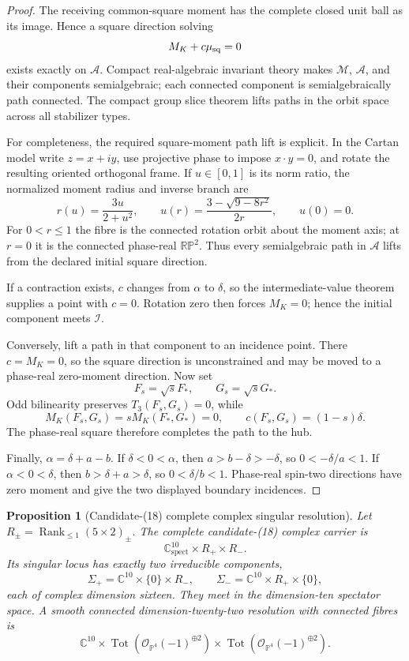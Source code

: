 \documentclass[11pt]{article}
\newtheorem{proposition}[theorem]{Proposition}
\theoremstyle{definition}
\theoremstyle{remark}
\begin{document}
\begin{proof}
The receiving common-square moment has the complete closed unit ball as its
image.  Hence a square direction solving
\[
 M_K+c\mu_{\rm sq}=0
\]
exists exactly on \(\mathcal A\).  Compact real-algebraic invariant theory
makes \(\mathcal M\), \(\mathcal A\), and their components semialgebraic;
each connected component is semialgebraically path connected.  The compact
group slice theorem lifts paths in the orbit space across all stabilizer
types.

For completeness, the required square-moment path lift is explicit.  In the
Cartan model write \(z=x+iy\), use projective phase to impose
\(x\cdot y=0\), and rotate the resulting oriented orthogonal frame.  If
\(u\in[0,1]\) is its norm ratio, the normalized moment radius and inverse
branch are
\[
 r(u)=\frac{3u}{2+u^2},\qquad
 u(r)=\frac{3-\sqrt{9-8r^2}}{2r},\qquad u(0)=0.
\]
For \(0<r\leq1\) the fibre is the connected rotation orbit about the moment
axis; at \(r=0\) it is the connected phase-real
\(\mathbb{RP}^2\).  Thus every semialgebraic path in \(\mathcal A\) lifts
from the declared initial square direction.

If a contraction exists, \(c\) changes from \(\alpha\) to \(\delta\), so
the intermediate-value theorem supplies a point with \(c=0\).  Rotation
zero then forces \(M_K=0\); hence the initial component meets
\(\mathcal I\).

Conversely, lift a path in that component to an incidence point.  There
\(c=M_K=0\), so the square direction is unconstrained and may be moved to a
phase-real zero-moment direction.  Now set
\[
 F_s=\sqrt{s}F_*,\qquad G_s=\sqrt{s}G_*.
\]
Odd bilinearity preserves \(T_3(F_s,G_s)=0\), while
\[
 M_K(F_s,G_s)=sM_K(F_*,G_*)=0,\qquad
 c(F_s,G_s)=(1-s)\delta.
\]
The phase-real square therefore completes the path to the hub.

Finally, \(\alpha=\delta+a-b\).  If \(\delta<0<\alpha\), then
\(a>b-\delta>-\delta\), so \(0<-\delta/a<1\).  If
\(\alpha<0<\delta\), then \(b>\delta+a>\delta\), so
\(0<\delta/b<1\).  Phase-real spin-two directions have zero moment and give
the two displayed boundary incidences.
\end{proof}

\begin{proposition}[Candidate-(18) complete complex singular resolution]
\label{prop:candidate-18-complex-singular-resolution}
Let \(R_\pm=\operatorname{Rank}_{\leq1}(5\times2)_\pm\).  The complete
candidate-(18) complex carrier is
\[
 \mathbb C^{10}_{\mathrm{spect}}\times R_+\times R_-.
\]
Its singular locus has exactly two irreducible components,
\[
 \Sigma_+=\mathbb C^{10}\times\{0\}\times R_-,
 \qquad
 \Sigma_-=\mathbb C^{10}\times R_+\times\{0\},
\]
each of complex dimension sixteen.  They meet in the dimension-ten spectator
space.  A smooth connected dimension-twenty-two resolution with connected
fibres is
\[
 \mathbb C^{10}\times
 \operatorname{Tot}\!\left(\mathcal O_{\mathbb P^4}(-1)^{\oplus2}\right)
 \times
 \operatorname{Tot}\!\left(\mathcal O_{\mathbb P^4}(-1)^{\oplus2}\right).
\]
\end{proposition}
\end{document}
